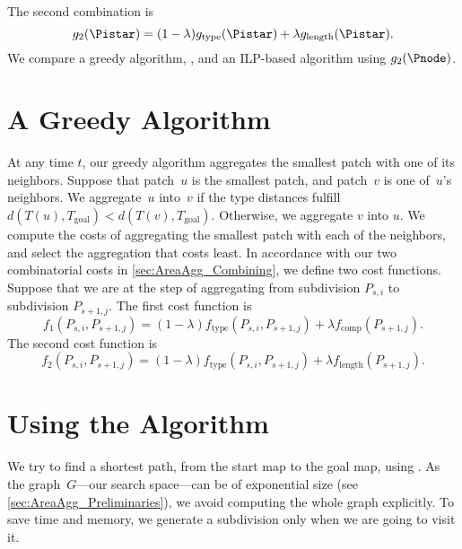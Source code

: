 The second combination is 
\begin{equation}
\label{eq:g_2}
g_2(\Pistar)= (1-\lambda)g_\mathrm{type}(\Pistar)
+\lambda g_\mathrm{length}(\Pistar).
\end{equation}
We compare a greedy algorithm, \Astar, and an ILP-based algorithm
using $g_2(\Pnode)$.



\section{A Greedy Algorithm}
\label{sec:AreaAgg_Greedy}
At any time $t$,
our greedy algorithm aggregates the smallest patch
with one of its neighbors.
Suppose that patch~$u$ is the smallest patch,
and patch~$v$ is one of~$u$'s neighbors.
We aggregate~$u$ into~$v$ 
if the type distances fulfill 
$d(T(u), T_\mathrm{goal})<d(T(v), T_\mathrm{goal})$.
Otherwise, we aggregate $v$ into $u$.
We compute the costs of aggregating the smallest patch 
with each of the neighbors, 
and select the aggregation that costs least.
In accordance 
with our two combinatorial costs in 
\sect\ref{sec:AreaAgg_Combining},
we define two cost functions.
Suppose that we are at the step of 
aggregating from subdivision $P_{s,i}$ to subdivision 
$P_{s+1,j}$.
The first cost function is 
\begin{equation}
\label{eq:f_1}
f_1(P_{s,i},P_{s+1,j})=
(1-\lambda)f_\mathrm{type}(P_{s,i},P_{s+1,j})
+\lambda f_{\mathrm{comp}}(P_{s+1,j}).
\end{equation}
The second cost function is
\begin{equation}
\label{eq:f_2}
f_2(P_{s,i},P_{s+1,j})=
(1-\lambda)f_\mathrm{type}(P_{s,i},P_{s+1,j})
+\lambda f_{\mathrm{length}}(P_{s+1,j}).
\end{equation}



\section{Using the \Astar Algorithm}
\label{sec:AreaAgg_AStar}




We try to find a shortest path,
from the start map to the goal map,
using \Astar \citep{Hart1968}.  
As the graph~$G$---our search space---can be of exponential size 
(see \sect\ref{sec:AreaAgg_Preliminaries}), 
we avoid computing the whole graph explicitly.
To save time and memory, 
we generate a subdivision \Pnode only 
when we are going to visit it.

